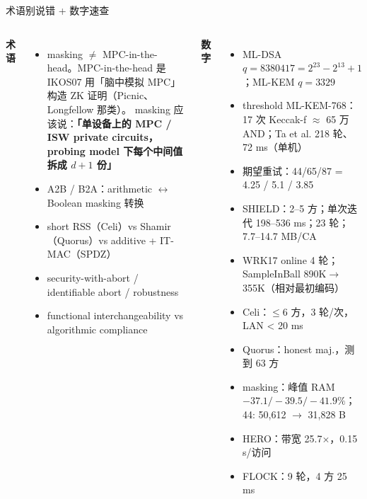 \documentclass[aspectratio=169,10pt,fontset=none]{ctexbeamer}
\begin{document}
\begin{frame}{术语别说错 + 数字速查}
\begin{columns}[T]
\textbf{术语}
\begin{itemize}
  \item \alert{masking $\neq$ MPC-in-the-head}。MPC-in-the-head 是 IKOS07 用「脑中模拟 MPC」构造 ZK 证明（Picnic、Longfellow 那类）。
        masking 应该说：\textbf{「单设备上的 MPC / ISW private circuits，probing model 下每个中间值拆成 $d+1$ 份」}
  \item A2B / B2A：arithmetic $\leftrightarrow$ Boolean masking 转换
  \item short RSS（Celi）vs Shamir（Quorus）vs additive + IT-MAC（SPDZ）
  \item security-with-abort / identifiable abort / robustness
  \item functional interchangeability vs algorithmic compliance
\end{itemize}
\textbf{数字}
\begin{itemize}
  \item ML-DSA $q=8380417=2^{23}-2^{13}+1$；ML-KEM $q=3329$
  \item threshold ML-KEM-768：17 次 Keccak-f $\approx$ 65 万 AND；Ta et al. 218 轮、72 ms（单机）
  \item 期望重试：44/65/87 = 4.25 / 5.1 / 3.85
  \item SHIELD：2--5 方；单次迭代 198--536 ms；23 轮；7.7--14.7 MB/CA
  \item WRK17 online 4 轮；SampleInBall 890K$\to$355K（相对最初编码）
  \item Celi：$\le$6 方，3 轮/次，LAN < 20 ms
  \item Quorus：honest maj.，测到 63 方
  \item masking：峰值 RAM $-37.1/-39.5/-41.9\%$；44: 50,612 $\to$ 31,828 B
  \item HERO：带宽 25.7$\times$，0.15 s/访问
  \item FLOCK：9 轮，4 方 25 ms
\end{itemize}
\end{columns}
\end{frame}
\end{document}
